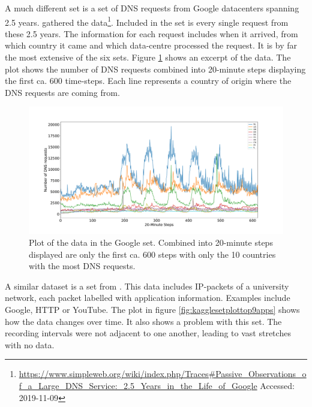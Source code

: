 A much different set is a set of DNS requests from Google datacenters spanning 2.5 years.
\cite{8506536} gathered the data\footnote{\url{https://www.simpleweb.org/wiki/index.php/Traces\#Passive_Observations_of_a_Large_DNS_Service:_2.5_Years_in_the_Life_of_Google} Accessed: 2019-11-09}.
Included in the set is every single request from these 2.5 years.
The information for each request includes when it arrived, from which country it came and which data-centre processed the request.
It is by far the most extensive of the six sets.
Figure \ref{fig:googleset10countriesfirstweek} shows an excerpt of the data.
The plot shows the number of DNS requests combined into 20-minute steps displaying the first ca. 600 time-steps.
Each line represents a country of origin where the DNS requests are coming from.
\begin{figure}
	\centering
	\includegraphics[width=1\linewidth]{Pictures/Dataset/GoogleSet10CountriesFirstWeek}
	\caption{Plot of the data in the Google set. Combined into 20-minute steps displayed are only the first ca. 600 steps with only the 10 countries with the most DNS requests.}
	\label{fig:googleset10countriesfirstweek}
\end{figure}

A similar dataset is a set from \cite{10.1007/978-3-319-95168-3_37}.
This data includes IP-packets of a university network, each packet labelled with application information. Examples include Google, HTTP or YouTube.
The plot in figure \ref{fig:kagglesetplottop9apps} shows how the data changes over time.
It also shows a problem with this set.
The recording intervals were not adjacent to one another, leading to vast stretches with no data.

